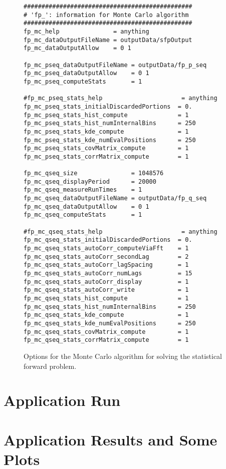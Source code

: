 \begin{figure}[h!]
\begin{center}
\begin{verbatim}
###############################################
# 'fp_': information for Monte Carlo algorithm
###############################################
fp_mc_help               = anything
fp_mc_dataOutputFileName = outputData/sfpOutput
fp_mc_dataOutputAllow    = 0 1

fp_mc_pseq_dataOutputFileName = outputData/fp_p_seq
fp_mc_pseq_dataOutputAllow    = 0 1
fp_mc_pseq_computeStats       = 1

#fp_mc_pseq_stats_help                      = anything
fp_mc_pseq_stats_initialDiscardedPortions  = 0.
fp_mc_pseq_stats_hist_compute              = 1
fp_mc_pseq_stats_hist_numInternalBins      = 250
fp_mc_pseq_stats_kde_compute               = 1
fp_mc_pseq_stats_kde_numEvalPositions      = 250
fp_mc_pseq_stats_covMatrix_compute         = 1
fp_mc_pseq_stats_corrMatrix_compute        = 1

fp_mc_qseq_size               = 1048576
fp_mc_qseq_displayPeriod      = 20000
fp_mc_qseq_measureRunTimes    = 1
fp_mc_qseq_dataOutputFileName = outputData/fp_q_seq
fp_mc_qseq_dataOutputAllow    = 0 1
fp_mc_qseq_computeStats       = 1

#fp_mc_qseq_stats_help                      = anything
fp_mc_qseq_stats_initialDiscardedPortions  = 0.
fp_mc_qseq_stats_autoCorr_computeViaFft    = 1
fp_mc_qseq_stats_autoCorr_secondLag        = 2
fp_mc_qseq_stats_autoCorr_lagSpacing       = 1
fp_mc_qseq_stats_autoCorr_numLags          = 15
fp_mc_qseq_stats_autoCorr_display          = 1
fp_mc_qseq_stats_autoCorr_write            = 1
fp_mc_qseq_stats_hist_compute              = 1
fp_mc_qseq_stats_hist_numInternalBins      = 250
fp_mc_qseq_stats_kde_compute               = 1
fp_mc_qseq_stats_kde_numEvalPositions      = 250
fp_mc_qseq_stats_covMatrix_compute         = 1
fp_mc_qseq_stats_corrMatrix_compute        = 1
\end{verbatim}
\end{center}
\caption{
Options for the Monte Carlo algorithm for solving the statistical forward problem.
}
\label{fig-options-input-3}
\end{figure}

\clearpage
\section{Application Run}

\clearpage
\section{Application Results and Some Plots}

